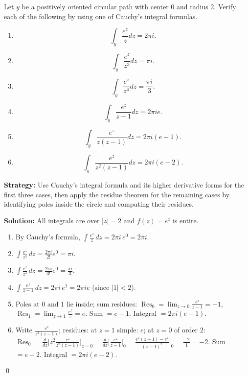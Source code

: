 \begin{problembox}
\begin{problemstatement}
Let \( y \) be a positively oriented circular path with center 0 and radius 2. Verify each of the following by using one of Cauchy's integral formulas.
\begin{enumerate}[label=(\alph*)]
\item \[ \int_y \frac{e^z}{z} dz = 2\pi i. \]
\item \[ \int_y \frac{e^z}{z^3} dz = \pi i. \]
\item \[ \int_y \frac{e^z}{z^4} dz = \frac{\pi i}{3}. \]
\item \[ \int_y \frac{e^z}{z - 1} dz = 2\pi ie. \]
\item \[ \int_y \frac{e^z}{z(z - 1)} dz = 2\pi i(e - 1). \]
\item \[ \int_y \frac{e^z}{z^2(z - 1)} dz = 2\pi i(e - 2). \]
\end{enumerate}
\end{problemstatement}
\end{problembox}

\noindent\textbf{Strategy:} Use Cauchy's integral formula and its higher derivative forms for the first three cases, then apply the residue theorem for the remaining cases by identifying poles inside the circle and computing their residues.

\bigskip\noindent\textbf{Solution:}
All integrals are over $|z|=2$ and $f(z)=e^z$ is entire.
\begin{enumerate}[label=(\alph*)]
\item By Cauchy's formula, $\int\frac{e^z}{z}\,dz=2\pi i\,e^0=2\pi i$.
\item $\int\frac{e^z}{z^3}\,dz=\frac{2\pi i}{2!}e^0=\pi i$.
\item $\int\frac{e^z}{z^4}\,dz=\frac{2\pi i}{3!}e^0=\frac{\pi i}{3}$.
\item $\int\frac{e^z}{z-1}\,dz=2\pi i\,e^1=2\pi i e$ (since $|1|<2$).
\item Poles at $0$ and $1$ lie inside; sum residues: $\operatorname{Res}_{0}=\lim_{z\to0}\frac{e^z}{z-1}=-1$, $\operatorname{Res}_{1}=\lim_{z\to1}\frac{e^z}{z}=e$. Sum $=e-1$. Integral $=2\pi i(e-1)$.
\item Write $\frac{e^z}{z^2(z-1)}$; residues: at $z=1$ simple: $e$; at $z=0$ of order $2$: $\operatorname{Res}_{0}=\frac{d}{dz}\big[z^2\frac{e^z}{z^2(z-1)}\big]_{z=0}=\frac{d}{dz}\big[\frac{e^z}{z-1}\big]_{0}=\frac{e^z(z-1)-e^z}{(z-1)^2}\Big|_{0}=\frac{-2}{1}= -2$. Sum $=e-2$. Integral $=2\pi i(e-2)$.
\end{enumerate}\qed


